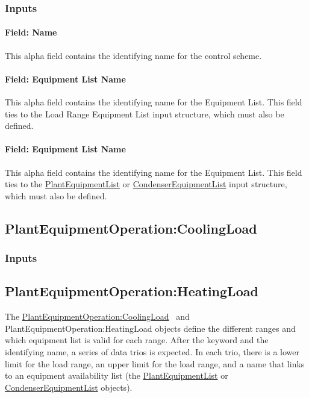 \subsubsection{Inputs}\label{inputs-2-028}

\paragraph{Field: Name}\label{field-name-2-027}

This alpha field contains the identifying name for the control scheme.

\paragraph{Field: Equipment List Name}\label{field-equipment-list-name}

This alpha field contains the identifying name for the Equipment List. This field ties to the Load Range Equipment List input structure, which must also be defined.

\paragraph{Field: Equipment List Name}\label{field-equipment-list-name-1}

This alpha field contains the identifying name for the Equipment List. This field ties to the \hyperref[plantequipmentlist]{PlantEquipmentList} or \hyperref[condenserequipmentlist]{CondenserEquipmentList} input structure, which must also be defined.

\subsection{PlantEquipmentOperation:CoolingLoad}\label{plantequipmentoperationcoolingload}

\subsubsection{Inputs}\label{inputs-3-025}

\subsection{PlantEquipmentOperation:HeatingLoad}\label{plantequipmentoperationheatingload}

The \hyperref[plantequipmentoperationcoolingload]{PlantEquipmentOperation:CoolingLoad} ~and PlantEquipmentOperation:HeatingLoad objects define the different ranges and which equipment list is valid for each range. After the keyword and the identifying name, a series of data trios is expected. In each trio, there is a lower limit for the load range, an upper limit for the load range, and a name that links to an equipment availability list (the \hyperref[plantequipmentlist]{PlantEquipmentList} or \hyperref[condenserequipmentlist]{CondenserEquipmentList} objects).

